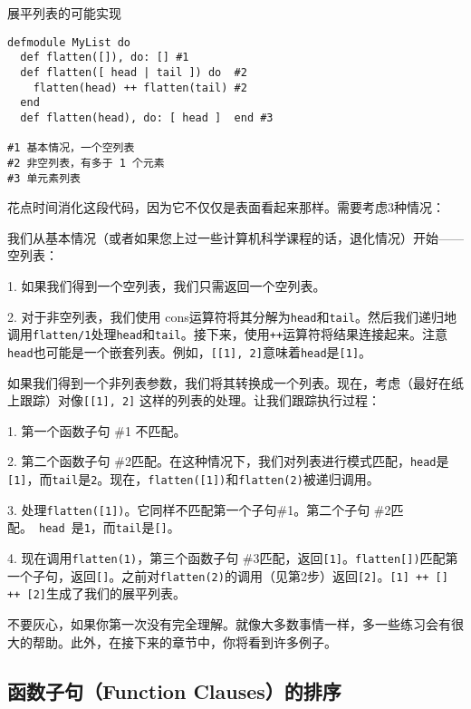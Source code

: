 \begin{code}{展平列表的可能实现}
\begin{verbatim}
defmodule MyList do
  def flatten([]), do: [] #1
  def flatten([ head | tail ]) do  #2
    flatten(head) ++ flatten(tail) #2
  end
  def flatten(head), do: [ head ]  end #3

#1 基本情况，一个空列表
#2 非空列表，有多于 1 个元素
#3 单元素列表
\end{verbatim}
\label{lst:possible_implementation_of_flattening_a_list}
\end{code}


花点时间消化这段代码，因为它不仅仅是表面看起来那样。需要考虑3种情况：

我们从基本情况（或者如果您上过一些计算机科学课程的话，退化情况）开始------ 空列表：

1. 如果我们得到一个空列表，我们只需返回一个空列表。 

2. 对于非空列表，我们使用 cons运算符将其分解为\texttt{head}和\texttt{tail}。然后我们递归地调用\texttt{flatten/1}处理\texttt{head}和\texttt{tail}。接下来，使用\texttt{++}运算符将结果连接起来。注意\texttt{head}也可能是一个嵌套列表。例如，\texttt{[[1], 2]}意味着\texttt{head}是\texttt{[1]}。

如果我们得到一个非列表参数，我们将其转换成一个列表。现在，考虑（最好在纸上跟踪）对像\texttt{[[1], 2]}
这样的列表的处理。让我们跟踪执行过程：

1. 第一个函数子句 \#1 不匹配。 

2. 第二个函数子句 \#2匹配。在这种情况下，我们对列表进行模式匹配，\texttt{head}是\texttt{[1]}，而\texttt{tail}是\texttt{2}。现在，\texttt{flatten([1])}和\texttt{flatten(2)}被递归调用。

3. 处理\texttt{flatten([1])}。它同样不匹配第一个子句\#1。第二个子句 \#2匹配。~\texttt{head}~是\texttt{1}，而\texttt{tail}是\texttt{[]}。

4. 现在调用\texttt{flatten(1)}，第三个函数子句 \#3匹配，返回\texttt{[1]}。\texttt{flatten[])}匹配第一个子句，返回\texttt{[]}。之前对\texttt{flatten(2)}的调用（见第2步）返回\texttt{[2]}。\texttt{[1] ++ [] ++ [2]}生成了我们的展平列表。

不要灰心，如果你第一次没有完全理解。就像大多数事情一样，多一些练习会有很大的帮助。此外，在接下来的章节中，你将看到许多例子。

\subsection{函数子句（Function Clauses）的排序}


